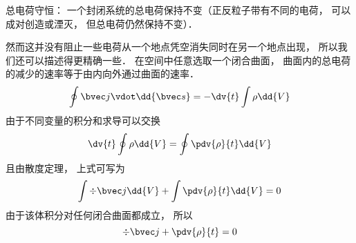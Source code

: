 
总电荷守恒： 一个封闭系统的总电荷保持不变（正反粒子带有不同的电荷， 可以成对创造或湮灭， 但总电荷仍然保持不变）．

然而这并没有阻止一些电荷从一个地点凭空消失同时在另一个地点出现， 所以我们还可以描述得更精确一些． 在空间中任意选取一个闭合曲面， 曲面内的总电荷的减少的速率等于由内向外通过曲面的速率．
\begin{equation}
\oint \bvec j \vdot \dd{\bvec s}  =  - \dv{t} \int \rho \dd{V}
\end{equation} 
由于不同变量的积分和求导可以交换%
\begin{equation}
\dv{t} \oint \rho  \dd{V}  = \oint \pdv{\rho}{t} \dd{V}
\end{equation}
且由散度定理， 上式可写为
\begin{equation}
\int \div \bvec j \dd{V}  + \int \pdv{\rho}{t} \dd{V}  = 0
\end{equation} 
由于该体积分对任何闭合曲面都成立， 所以
\begin{equation}\label{ChgCsv_eq4}
\div \bvec j + \pdv{\rho}{t} = 0
\end{equation} 